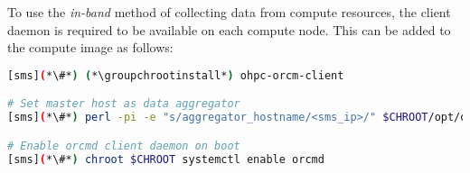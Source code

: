 To use the {\em in-band} method of collecting data from compute resources, the
\ORCM{} client daemon is required to be available on each compute node. This can
be added to the compute image as follows:

\begin{lstlisting}[language=bash,keywords={},upquote=true]
[sms](*\#*) (*\groupchrootinstall*) ohpc-orcm-client

# Set master host as data aggregator
[sms](*\#*) perl -pi -e "s/aggregator_hostname/<sms_ip>/" $CHROOT/opt/open-rcm/etc/orcm-site.xml

# Enable orcmd client daemon on boot
[sms](*\#*) chroot $CHROOT systemctl enable orcmd
\end{lstlisting}

